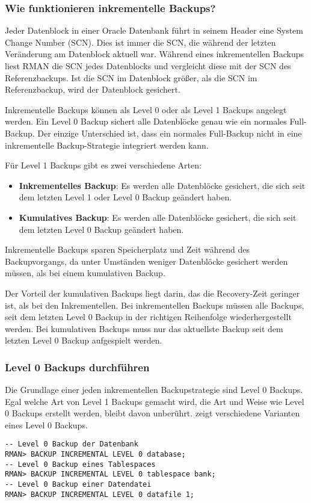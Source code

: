         \subsubsection{Wie funktionieren inkrementelle Backups?}
          Jeder Datenblock in einer Oracle Datenbank führt in seinem Header eine System Change Number (SCN). Dies ist immer die SCN, die während der letzten Veränderung am Datenblock aktuell war. Während eines inkrementellen Backups liest RMAN die SCN jedes Datenblocks und vergleicht diese mit der SCN des Referenzbackups. Ist die SCN im Datenblock größer, als die SCN im Referenzbackup, wird der Datenblock gesichert.

          Inkrementelle Backups können als Level 0 oder als Level 1 Backups angelegt werden. Ein Level 0 Backup sichert alle Datenblöcke genau wie ein normales Full-Backup. Der einzige Unterschied ist, dass ein normales Full-Backup nicht in eine inkrementelle Backup-Strategie integriert werden kann.

          Für Level 1 Backups gibt es zwei verschiedene Arten:
          \begin{itemize}
            \item \textbf{Inkrementelles Backup}: Es werden alle Datenblöcke gesichert, die sich seit dem letzten Level 1 oder Level 0 Backup geändert haben.
            \item \textbf{Kumulatives Backup}: Es werden alle Datenblöcke gesichert, die sich seit dem letzten Level 0 Backup geändert haben.
          \end{itemize}
           Inkrementelle Backups sparen Speicherplatz und Zeit während des Backupvorgangs, da unter Umständen weniger Datenblöcke gesichert werden müssen, als bei einem kumulativen Backup.

          Der Vorteil der kumulativen Backups liegt darin, das die Recovery-Zeit geringer ist, als bei den Inkrementellen. Bei inkrementellen Backups müssen alle Backups, seit dem letzten Level 0 Backup in der richtigen Reihenfolge wiederhergestellt werden. Bei kumulativen Backups muss nur das aktuellste Backup seit dem letzten Level 0 Backup aufgespielt werden.
        \subsubsection{Level 0 Backups durchführen}
          Die Grundlage einer jeden inkrementellen Backupstrategie sind Level 0 Backups. Egal welche Art von Level 1 Backups gemacht wird, die Art und Weise wie Level 0 Backups erstellt werden, bleibt davon unberührt.  zeigt verschiedene Varianten eines Level 0 Backups.
          \begin{lstlisting}[caption={Inkrementelles Level 0 Backup},label=admin1313,language=rman]
-- Level 0 Backup der Datenbank
RMAN> BACKUP INCREMENTAL LEVEL 0 database;
-- Level 0 Backup eines Tablespaces
RMAN> BACKUP INCREMENTAL LEVEL 0 tablespace bank;
-- Level 0 Backup einer Datendatei
RMAN> BACKUP INCREMENTAL LEVEL 0 datafile 1;
          \end{lstlisting}

